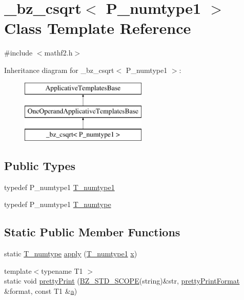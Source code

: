 \hypertarget{class__bz__csqrt}{}\section{\+\_\+bz\+\_\+csqrt$<$ P\+\_\+numtype1 $>$ Class Template Reference}
\label{class__bz__csqrt}


{\ttfamily \#include $<$mathf2.\+h$>$}

Inheritance diagram for \+\_\+bz\+\_\+csqrt$<$ P\+\_\+numtype1 $>$\+:\begin{figure}[H]
\begin{center}
\leavevmode
\includegraphics[height=3.000000cm]{class__bz__csqrt}
\end{center}
\end{figure}
\subsection*{Public Types}
\begin{DoxyCompactItemize}
\item 
typedef P\+\_\+numtype1 \hyperlink{class__bz__csqrt_a8948e759fb470928ca2550c034cec9b3}{T\+\_\+numtype1}
\item 
typedef P\+\_\+numtype1 \hyperlink{class__bz__csqrt_ab58548bd6b19fce8d651fccea34ac2c2}{T\+\_\+numtype}
\end{DoxyCompactItemize}
\subsection*{Static Public Member Functions}
\begin{DoxyCompactItemize}
\item 
static \hyperlink{class__bz__csqrt_ab58548bd6b19fce8d651fccea34ac2c2}{T\+\_\+numtype} \hyperlink{class__bz__csqrt_a38892bcb87e57a6aede961072f6b3180}{apply} (\hyperlink{class__bz__csqrt_a8948e759fb470928ca2550c034cec9b3}{T\+\_\+numtype1} \hyperlink{vecnorm1_8cc_ac73eed9e41ec09d58f112f06c2d6cb63}{x})
\item 
{\footnotesize template$<$typename T1 $>$ }\\static void \hyperlink{class__bz__csqrt_a41f5aec6d85adaf3040f4eaab6d82bc8}{pretty\+Print} (\hyperlink{numinquire_8h_a2b24ffc3b4ef9803956bc7715c6c7b83}{B\+Z\+\_\+\+S\+T\+D\+\_\+\+S\+C\+O\+P\+E}(string)\&str, \hyperlink{classprettyPrintFormat}{pretty\+Print\+Format} \&format, const T1 \&\hyperlink{gen__mat5files_8m_aae328bf20413f220e38aec4d95bfd6da}{a})
\end{DoxyCompactItemize}


